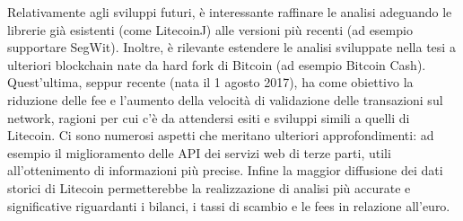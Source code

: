 Relativamente agli sviluppi futuri, è interessante raffinare le analisi adeguando le librerie già esistenti (come LitecoinJ) alle versioni più recenti (ad esempio supportare SegWit). 
Inoltre, è rilevante estendere le analisi sviluppate nella tesi a ulteriori blockchain nate da hard fork di Bitcoin (ad esempio Bitcoin Cash). Quest’ultima, seppur recente (nata il 1 agosto 2017), ha come obiettivo la riduzione delle fee e l’aumento della velocità di validazione delle transazioni sul network, ragioni per cui c’è da attendersi esiti e sviluppi simili a quelli di Litecoin.
Ci sono numerosi aspetti che meritano ulteriori approfondimenti: ad esempio il miglioramento delle API dei servizi web di terze parti, utili all'ottenimento di informazioni più precise. Infine la maggior diffusione dei dati storici di Litecoin permetterebbe la realizzazione di analisi più accurate e significative riguardanti i bilanci, i tassi di scambio e le fees in relazione all'euro.

